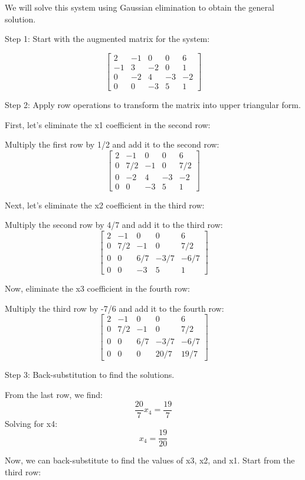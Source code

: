 We will solve this system using Gaussian elimination to obtain the general solution.

Step 1: Start with the augmented matrix for the system:

\[
\begin{bmatrix}
	2 & -1 & 0 & 0 & 6 \\
	-1 & 3 & -2 & 0 & 1 \\
	0 & -2 & 4 & -3 & -2 \\
	0 & 0 & -3 & 5 & 1
\end{bmatrix}
\]

Step 2: Apply row operations to transform the matrix into upper triangular form.

First, let's eliminate the x1 coefficient in the second row:

Multiply the first row by 1/2 and add it to the second row:
\[
\begin{bmatrix}
	2 & -1 & 0 & 0 & 6 \\
	0 & 7/2 & -1 & 0 & 7/2 \\
	0 & -2 & 4 & -3 & -2 \\
	0 & 0 & -3 & 5 & 1
\end{bmatrix}
\]

Next, let's eliminate the x2 coefficient in the third row:

Multiply the second row by 4/7 and add it to the third row:
\[
\begin{bmatrix}
	2 & -1 & 0 & 0 & 6 \\
	0 & 7/2 & -1 & 0 & 7/2 \\
	0 & 0 & 6/7 & -3/7 & -6/7 \\
	0 & 0 & -3 & 5 & 1
\end{bmatrix}
\]

Now, eliminate the x3 coefficient in the fourth row:

Multiply the third row by -7/6 and add it to the fourth row:
\[
\begin{bmatrix}
	2 & -1 & 0 & 0 & 6 \\
	0 & 7/2 & -1 & 0 & 7/2 \\
	0 & 0 & 6/7 & -3/7 & -6/7 \\
	0 & 0 & 0 & 20/7 & 19/7
\end{bmatrix}
\]

Step 3: Back-substitution to find the solutions.

From the last row, we find:
\[ \frac{20}{7}x_4 = \frac{19}{7} \]
Solving for x4:
\[ x_4 = \frac{19}{20} \]

Now, we can back-substitute to find the values of x3, x2, and x1. Start from the third row:

